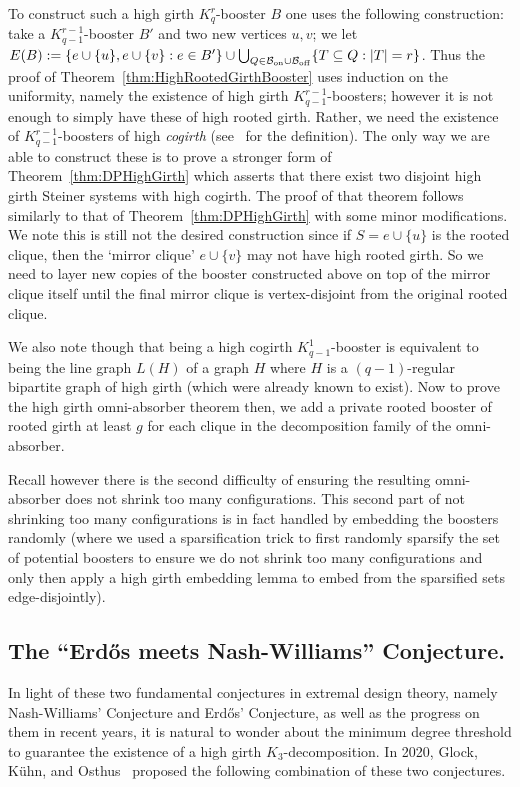 \documentclass[twoside,leqno]{article}
\begin{document}
To construct such a high girth $K_q^r$-booster $B$ one uses the following construction: take a $K_{q-1}^{r-1}$-booster $B'$ and two new vertices $u,v$; we let $E(B):=\{ e\cup \{u\}, e\cup \{v\}: e\in B'\} \cup \bigcup_{Q\in \mathcal{B}_{\rm on}\cup \mathcal{B}_{\rm off}} \{ T\subseteq Q: |T|=r\}$. Thus the proof of Theorem~\ref{thm:HighRootedGirthBooster} uses induction on the uniformity, namely the existence of high girth $K_{q-1}^{r-1}$-boosters; however it is not enough to simply have these of high rooted girth. Rather, we need the existence of $K_{q-1}^{r-1}$-boosters of high \emph{cogirth} (see~\cite{DPII} for the definition). The only way we are able to construct these is to prove a stronger form of Theorem~\ref{thm:DPHighGirth} which asserts that there exist two disjoint high girth Steiner systems with high cogirth. The proof of that theorem follows similarly to that of Theorem~\ref{thm:DPHighGirth} with some minor modifications. We note this is still not the desired construction since if $S=e\cup \{u\}$ is the rooted clique, then the `mirror clique' $e\cup \{v\}$ may not have high rooted girth. So we need to layer new copies of the booster constructed above on top of the mirror clique itself until the final mirror clique is vertex-disjoint from the original rooted clique.

We also note though that being a high cogirth $K_{q-1}^{1}$-booster is equivalent to being the line graph $L(H)$ of a graph $H$ where $H$ is a $(q-1)$-regular bipartite graph of high girth (which were already known to exist). Now to prove the high girth omni-absorber theorem then, we add a private rooted booster of rooted girth at least $g$ for each clique in the decomposition family of the omni-absorber. 

Recall however there is the second difficulty of ensuring the resulting omni-absorber does not shrink too many configurations. This second part of not shrinking too many configurations is in fact handled by embedding the boosters randomly (where we used a sparsification trick to first randomly sparsify the set of potential boosters to ensure we do not shrink too many configurations and only then apply a high girth embedding lemma to embed from the sparsified sets edge-disjointly). 

\subsection{The ``Erd\H{o}s meets Nash-Williams'' Conjecture.}

In light of these two fundamental conjectures in extremal design theory, namely Nash-Williams' Conjecture and Erd\H{o}s' Conjecture, as well as the progress on them in recent years, it is natural to wonder about the minimum degree threshold to guarantee the existence of a high girth $K_3$-decomposition. In 2020, Glock, K\"uhn, and Osthus~\cite[Conjecture 7.7]{GKO20Survey} proposed the following combination of these two conjectures.
\end{document}
